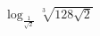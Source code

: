 \begin{ex}
	\begin{condition}
		\( \log_{\frac{1}{\sqrt{2}}} \sqrt[3]{128\sqrt{2}} \)
	\end{condition}
\end{ex}